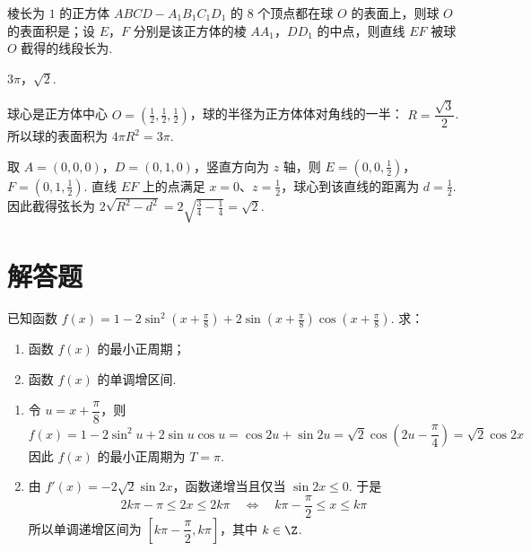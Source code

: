 \begin{problem}
棱长为 \(1\) 的正方体 \(ABCD - A_{1}B_{1}C_{1}D_{1}\) 的 \(8\) 个顶点都在球 \(O\) 的表面上，则球 \(O\) 的表面积是\fillinblank{}；设 \(E\)，\(F\) 分别是该正方体的棱 \(AA_{1}\)，\(DD_{1}\) 的中点，则直线 \(EF\) 被球 \(O\) 截得的线段长为\fillinblank{}.
\end{problem}

\begin{answer}
\(3\pi\)，\(\sqrt{2}\).
\end{answer}

\begin{solution}
球心是正方体中心 \(O=\left(\frac12,\frac12,\frac12\right)\)，球的半径为正方体体对角线的一半：
\(R=\dfrac{\sqrt3}{2}\). 所以球的表面积为 \(4\pi R^{2}=3\pi\).

取 \(A=(0,0,0)\)，\(D=(0,1,0)\)，竖直方向为 \(z\) 轴，则
\(E=\left(0,0,\frac12\right)\)，\(F=\left(0,1,\frac12\right)\). 直线 \(EF\) 上的点满足 \(x=0\)、\(z=\frac12\)，球心到该直线的距离为 \(d=\frac12\). 因此截得弦长为
\(2\sqrt{R^{2}-d^{2}}=2\sqrt{\frac34-\frac14}=\sqrt2\).
\end{solution}

\section{解答题}

\begin{problem}
已知函数 \( f(x) = 1 - 2\sin^2\left(x + \frac{\pi}{8}\right) + 2\sin \left(x + \frac{\pi}{8}\right)\cos \left(x + \frac{\pi}{8}\right) \). 求：

\begin{enumerate}
\item 函数 \( f(x) \) 的最小正周期；
\item 函数 \( f(x) \) 的单调增区间.
\end{enumerate}
\end{problem}

\begin{solution}
\begin{enumerate}
\item 令 \(u=x+\dfrac{\pi}{8}\)，则
\[
f(x)=1-2\sin ^2u+2\sin u\cos u
=\cos 2u+\sin 2u
=\sqrt{2}\cos\left(2u-\frac{\pi}{4}\right)
=\sqrt{2}\cos 2x
\]
因此 \(f(x)\) 的最小正周期为 \(T=\pi\).
\item 由 \(f'(x)=-2\sqrt{2}\sin 2x\)，函数递增当且仅当
\(\sin 2x\leqslant0\). 于是
\[
2k\pi-\pi\leqslant2x\leqslant2k\pi
\quad\Longleftrightarrow\quad
k\pi-\frac{\pi}{2}\leqslant x\leqslant k\pi
\]
所以单调递增区间为
\(\left[k\pi-\dfrac{\pi}{2},k\pi\right]\)，其中 \(k\in\Z\).
\end{enumerate}
\end{solution}

